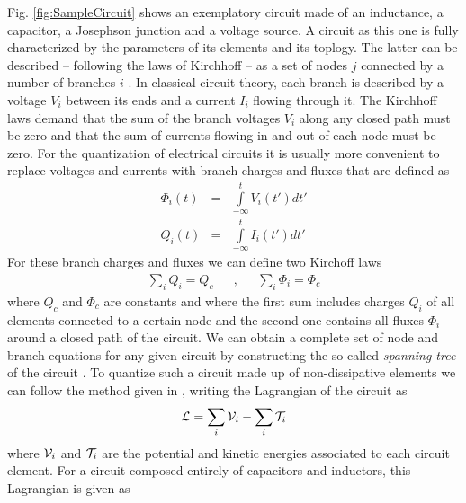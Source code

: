 Fig. \ref{fig:SampleCircuit} shows an exemplatory circuit made of an inductance, a capacitor, a Josephson junction and a voltage source. A circuit as this one is fully characterized by the parameters of its elements and its toplogy. The latter can be described -- following the laws of Kirchhoff -- as a set of nodes $j$ connected by a number of branches $i$ . In classical circuit theory, each branch is described by a voltage $V_i$ between its ends and a current $I_{i}$ flowing through it. The Kirchhoff laws demand that the sum of the branch voltages $V_i$ along any closed path must be zero and that the sum of currents flowing in and out of each node must be zero. For the quantization of electrical circuits it is usually more convenient to replace voltages and currents with branch charges and fluxes that are defined as
%
\begin{eqnarray}
\Phi_i(t) & = & \int\limits_{-\infty}^t V_i(t') dt' \\
Q_i(t) & = & \int\limits_{-\infty}^t I_i(t') dt'
\end{eqnarray}
%
For these branch charges and fluxes we can define two Kirchoff laws
%
\begin{align}
\sum\limits_{i} Q_i  =  Q_c & & , & & \sum\limits_{i}\Phi_i = \Phi_c \label{eq:kirchhoff_charge}
\end{align}
%
where $Q_c$ and $\Phi_c$ are constants and where the first sum includes charges $Q_i$ of all elements connected to a certain node and the second one contains all fluxes $\Phi_i$ around a closed path of the circuit. We can obtain a complete set of node and branch equations for any given circuit by constructing the so-called {\it spanning tree} of the circuit \citep{devoret_quantum_1995}. To quantize such a circuit made up of non-dissipative elements we can follow the method given in \cite{yurke_quantum_1984}, writing the Lagrangian of the circuit as 
%
\begin{equation}
\begin{mathcal}L\end{mathcal} = \sum\limits_i \begin{mathcal}V\end{mathcal}_i - \sum\limits_i \begin{mathcal}T\end{mathcal}_i
\end{equation}
%
where $\begin{mathcal}V\end{mathcal}_i$ and $\begin{mathcal}T\end{mathcal}_i$ are the potential and kinetic energies associated to each circuit element. For a circuit composed entirely of capacitors and inductors, this Lagrangian is given as
